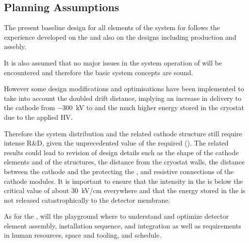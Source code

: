 \subsection{Planning Assumptions}
\label{sec:fddp-hv-org-assmp}

The present baseline design for all elements of the  system for  follows the experience developed on the  and also on the  designs including production and assebly.  

It is also assumed that no major issues in the  system operation of  will be encountered and therefore the basic  system concepts are sound.

However some design modifications and optimisations have been implemented to take into account the %
doubled drift distance, implying an increase in  delivery to the cathode from \SI{-300}{\kV} to \dptargetdriftvoltneg{} and the much higher energy stored in the cryostat due to the applied HV.

Therefore the \dual {} system distribution and the related cathode structure still require intense R\&D, given the unprecedented value of the required  (\dptargetdriftvoltneg).
The related results could lead to revision of design details such as the shape of the cathode elements and of the %
 structures, the distance from the cryostat walls, the distance between the cathode and the %
 protecting the , and resistive connections of the cathode modules. It is important to ensure that the \efield intensity in the \lar is below the critical value of  about \SI{30}{\kV/\cm} everywhere and that the energy stored in the  is not released catastrophically to the detector membrane. %

As for the ,  will the playground where to understand and optimize detector element assembly, installation sequence, and integration as well as requirements in %
human resources, space and tooling, and schedule. 



%
%
%

